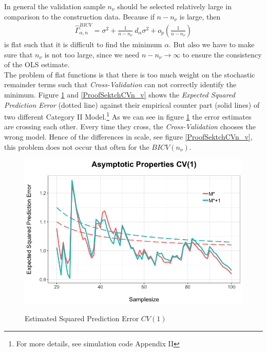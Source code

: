 \documentclass[Research_Module_ES.tex]{subfiles}
\begin{document}
In general the validation sample $n_\nu$ should be selected relatively large in comparison to the construction data. Because if $n-n_\nu$ is large, then 
\begin{align*}
\hat{\Gamma}^{BICV}_{\alpha,n}=\sigma^2+\frac{1}{n-n_\nu}~d_\alpha\sigma^2+o_p\left(\frac{1}{n-n_\nu}\right)
\end{align*}
is flat such that it is difficult to find the minimum $\alpha$. But also we have to make sure that $n_\nu$ is not too large, since we need $n-n_\nu\to\infty$ to ensure the consistency of the OLS estimate.\\

The problem of flat functions is that  there is too much weight on the stochastic remainder terms such that \textit{Cross-Validation} can not correctly identify the minimum. Figure \ref{ProofSketchCV1} and \ref{ProofSektchCVn_v} shows the \textit{Expected Squared Prediction Error} (dotted line) against their empirical counter part (solid lines) of two different Category II Model.\footnote{For more details, see simulation code Appendix II} As we can see in figure \ref{ProofSketchCV1} the error estimates are crossing each other. Every time they cross, the \textit{Cross-Validation} chooses the wrong model. Hence of the differences in scale, see figure \ref{ProofSektchCVn_v}, this problem does not occur that often for the $BICV(n_\nu)$.\\
\begin{figure}[!h]
	\label{ProofSketchCV1}
	\centering
	\includegraphics[width=1\textwidth]{ProofSketchN1.png}\\
	\caption{Estimated Squared Prediction Error $CV(1)$}
\end{figure}
\end{document}
